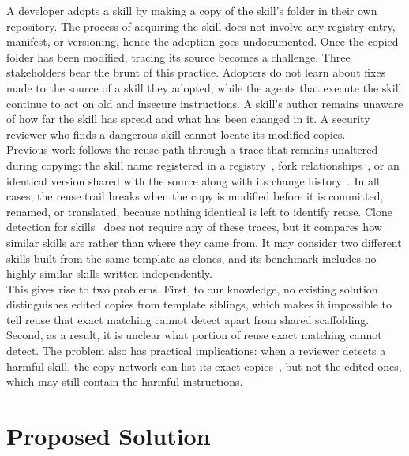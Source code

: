 \documentclass[sigconf,screen]{acmart}
\begin{document}
A developer adopts a skill by making a copy of the skill's folder in their own repository. The process of acquiring the skill does not involve any registry entry, manifest, or versioning, hence the adoption goes undocumented. Once the copied folder has been modified, tracing its source becomes a challenge. Three stakeholders bear the brunt of this practice. Adopters do not learn about fixes made to the source of a skill they adopted, while the agents that execute the skill continue to act on old and insecure instructions. A skill's author remains unaware of how far the skill has spread and what has been changed in it. A security reviewer who finds a dangerous skill cannot locate its modified copies. \\
Previous work follows the reuse path through a trace that remains unaltered during copying: the skill name registered in a registry~\cite{gao2026registry}, fork relationships~\cite{wu2026adaptation}, or an identical version shared with the source along with its change history~\cite{seddik2026constellations}. In all cases, the reuse trail breaks when the copy is modified before it is committed, renamed, or translated, because nothing identical is left to identify reuse. Clone detection for skills~\cite{zhu2026skillreuse} does not require any of these traces, but it compares how similar skills are rather than where they came from. It may consider two different skills built from the same template as clones, and its benchmark includes no highly similar skills written independently. \\
This gives rise to two problems. First, to our knowledge, no existing solution distinguishes edited copies from template siblings, which makes it impossible to tell reuse that exact matching cannot detect apart from shared scaffolding. Second, as a result, it is unclear what portion of reuse exact matching cannot detect. The problem also has practical implications: when a reviewer detects a harmful skill, the copy network can list its exact copies~\cite{seddik2026constellations}, but not the edited ones, which may still contain the harmful instructions.


\section{Proposed Solution}
\label{Section:Proposed}
\end{document}
